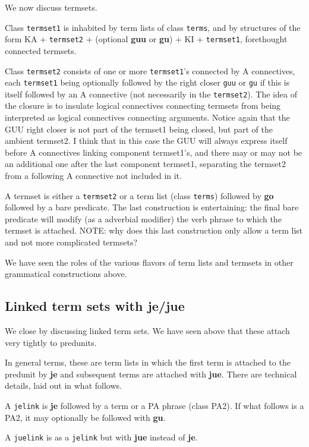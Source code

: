 \documentclass[12pt]{book}
\begin{document}
We now discuss termsets.

Class {\tt termset1} is inhabited by term lists of class {\tt terms}, and by structures of the form KA + {\tt termset2} + (optional {\bf guu} or {\bf gu}) + KI + {\tt termset1}, forethought connected termsets.

Class {\tt termset2} consists of one or more {\tt termset1}'s connected by A connectives, each {\tt termset1} being optionally followed by
the right closer {\tt guu} or {\tt gu} if this is itself followed by an A connective (not necessarily in the {\tt termset2}).  The idea of the closure is to insulate logical connectives connecting termsets
from being interpreted as logical connectives connecting arguments.  Notice again that the GUU right closer is not part of the termset1 being closed,
but part of the ambient termset2.  I think that in this case the GUU will always express itself before A connectives linking component termset1's, and there may or may not be an additional one after the last component termset1, separating the termset2 from a following A connective not included in it.

A termset is either a {\tt termset2} or a term list (class {\tt terms}) followed by {\bf go} followed by a bare predicate.  The last construction is entertaining:  the final bare predicate will modify (as a adverbial modifier)  the verb phrase to which the termset is attached.  NOTE:  why does this last construction only allow a term list and not more complicated termsets?

We have seen the roles of the various flavors of term lists and termsets in other grammatical constructions above.


\subsection{Linked term sets with {\bf je/jue}}

We close by discussing linked term sets.  We have seen above that these attach very tightly to predunits.

In general terms, these are term lists in which the first term is attached to the predunit by {\bf je} and subsequent terms are attached
with {\bf jue}.  There are technical details, laid out in what follows.

A {\tt jelink} is {\bf je} followed by a term or a PA phrase (class PA2).  If what follows is a PA2, it may optionally be followed with {\bf gu}.

A {\tt juelink} is as a {\tt jelink} but with {\bf jue} instead of {\bf je}.
\end{document}
